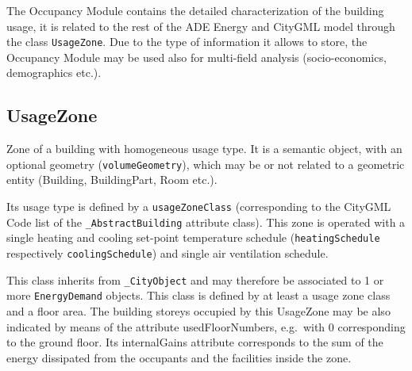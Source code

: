 \documentclass[a4paper,12pt]{article}
\begin{document}
The Occupancy Module contains the detailed characterization of the
building usage, it is related to the rest of the ADE Energy and CityGML
model through the class \texttt{UsageZone}. Due to the type of
information it allows to store, the Occupancy Module may be used also
for multi-field analysis (socio-economics, demographics etc.).

\subsection{UsageZone}\label{usagezone}

Zone of a building with homogeneous usage type. It is a semantic object,
with an optional geometry (\texttt{volumeGeometry}), which may be or not
related to a geometric entity (Building, BuildingPart, Room etc.).

Its usage type is defined by a \texttt{usageZoneClass} (corresponding to
the CityGML Code list of the \texttt{\_AbstractBuilding} attribute
class). This zone is operated with a single heating and cooling
set-point temperature schedule (\texttt{heatingSchedule} respectively
\texttt{coolingSchedule}) and single air ventilation schedule.

This class inherits from \texttt{\_CityObject} and may therefore be
associated to 1 or more \texttt{EnergyDemand} objects. This class is
defined by at least a usage zone class and a floor area. The building
storeys occupied by this UsageZone may be also indicated by means of the
attribute usedFloorNumbers, e.g.~with 0 corresponding to the ground
floor. Its internalGains attribute corresponds to the sum of the energy
dissipated from the occupants and the facilities inside the zone.
\end{document}
